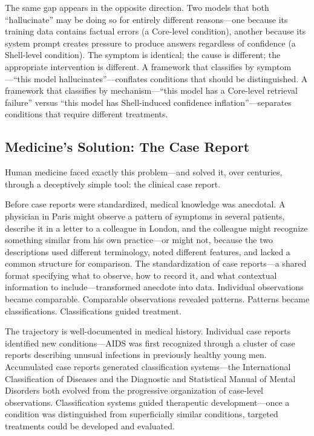 \documentclass[11pt]{article}
\begin{document}
The same gap appears in the opposite direction. Two models that both ``hallucinate'' may be doing so for entirely different reasons---one because its training data contains factual errors (a Core-level condition), another because its system prompt creates pressure to produce answers regardless of confidence (a Shell-level condition). The symptom is identical; the cause is different; the appropriate intervention is different. A framework that classifies by symptom---``this model hallucinates''---conflates conditions that should be distinguished. A framework that classifies by mechanism---``this model has a Core-level retrieval failure'' versus ``this model has Shell-induced confidence inflation''---separates conditions that require different treatments.

\subsection{Medicine's Solution: The Case Report}

Human medicine faced exactly this problem---and solved it, over centuries, through a deceptively simple tool: the clinical case report.

Before case reports were standardized, medical knowledge was anecdotal. A physician in Paris might observe a pattern of symptoms in several patients, describe it in a letter to a colleague in London, and the colleague might recognize something similar from his own practice---or might not, because the two descriptions used different terminology, noted different features, and lacked a common structure for comparison. The standardization of case reports---a shared format specifying what to observe, how to record it, and what contextual information to include---transformed anecdote into data. Individual observations became comparable. Comparable observations revealed patterns. Patterns became classifications. Classifications guided treatment.

The trajectory is well-documented in medical history. Individual case reports identified new conditions---AIDS was first recognized through a cluster of case reports describing unusual infections in previously healthy young men. Accumulated case reports generated classification systems---the International Classification of Diseases and the Diagnostic and Statistical Manual of Mental Disorders both evolved from the progressive organization of case-level observations. Classification systems guided therapeutic development---once a condition was distinguished from superficially similar conditions, targeted treatments could be developed and evaluated.
\end{document}
